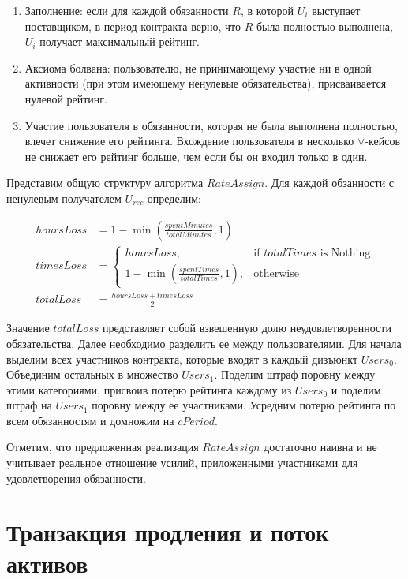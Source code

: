 \documentclass[specification,annotation]{itmo-student-thesis}
\begin{document}
\begin{enumerate}

\item Заполнение: если для каждой обязанности $R$, в которой $U_i$
  выступает поставщиком, в период контракта верно, что $R$ была
  полностью выполнена, $U_i$ получает максимальный рейтинг.

\item Аксиома болвана: пользователю, не принимающему участие ни в
  одной активности (при этом имеющему ненулевые обязательства),
  присваивается нулевой рейтинг.

\item Участие пользователя в обязанности, которая не была выполнена
  полностью, влечет снижение его рейтинга. Вхождение пользователя в
  несколько $\vee$-кейсов не снижает его рейтинг больше, чем если бы
  он входил только в один.
\end{enumerate}

Представим общую структуру алгоритма $RateAssign$. Для каждой
обзанности с ненулевым получателем $U_{rec}$ определим:

\begin{align*}
hoursLoss &= 1 - \min(\frac{spentMinutes}{totalMinutes}, 1)
\\
timesLoss &=
\begin{cases}
          hoursLoss, & \text{if } totalTimes \text{ is Nothing} \\
          1 - \min(\frac{spentTimes}{totalTimes}, 1), & \text{otherwise}
\end{cases}
\\
totalLoss &= \frac{hoursLoss + timesLoss}{2}
\end{align*}

Значение $totalLoss$ представляет собой взвешенную долю
неудовлетворенности обязательства. Далее необходимо разделить ее между
пользователями. Для начала выделим всех участников контракта, которые
входят в каждый дизъюнкт $Users_0$. Объединим остальных в множество
$Users_1$. Поделим штраф поровну между этими категориями, присвоив
потерю рейтинга каждому из $Users_0$ и поделим штраф на $Users_1$
поровну между ее участниками.  Усредним потерю рейтинга по всем
обязанностям и домножим на $cPeriod$.

Отметим, что предложенная реализация $RateAssign$ достаточно наивна и
не учитывает реальное отношение усилий, приложенными участниками для
удовлетворения обязанности.

\section{Транзакция продления и поток активов}
\end{document}
